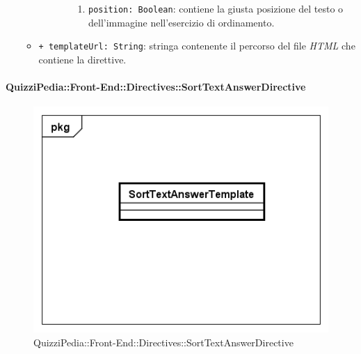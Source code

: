 \begin{itemize}
\begin{itemize}
\begin{itemize}
\begin{itemize}
						\begin{enumerate}
							\item \texttt{position: Boolean}: contiene la giusta posizione del testo o dell'immagine nell'esercizio di ordinamento.
						\end{enumerate}
					\end{itemize}
				\end{itemize}
				\item \texttt{+ templateUrl: String}: stringa contenente il percorso del file \textit{HTML} che contiene la direttive.
			\end{itemize}
		\end{itemize}
		
		\paragraph{QuizziPedia::Front-End::Directives::SortTextAnswerDirective}
		
		\label{QuizziPedia::Front-End::Directives::SortTextAnswerDirective}
		
		\begin{figure}[ht]
			\centering
			\includegraphics[scale=0.80,keepaspectratio]{UML/Classi/Front-End/QuizziPedia_Front-end_Templates_SortTextAnswerTemplate.png}
			\caption{QuizziPedia::Front-End::Directives::SortTextAnswerDirective}
		\end{figure} \FloatBarrier
		
